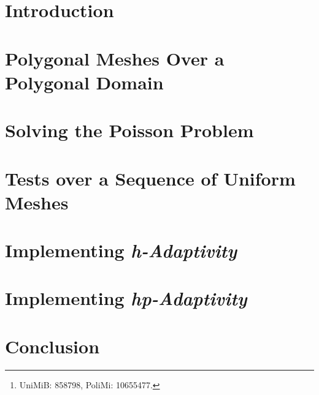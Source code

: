 \documentclass[12pt, twoside]{article}
\title{\reporttitle}
\author{Andrea Di Antonio\footnote{UniMiB: 858798, PoliMi: 10655477.} \\ Supervised by Professors Paola F. Antonietti and Marco Verani}
\date{Exam session of September 10th, 2024 \\ Academic Year 2023-24}
\begin{document}
	\maketitle
	\thispagestyle{fancy}

	\begin{abstract}
		\begin{center}
			This report details the implementation of the \textit{hp-adaptive} discontinuous Galërkin method, as part of the course \textit{Advanced Programming for Scientific Computing}. It covers key aspects including mesh generation, problem solving, and the integration of \textit{hp-adaptivity}. For technical details, refer to the project repository on \href{https://github.com/diantonioandrea/pacs-project}{GitHub}.
		\end{center}
	\end{abstract}

	\newpage
	\tableofcontents

	\newpage
    \section{Introduction}
	

	\newpage
    \section{Polygonal Meshes Over a Polygonal Domain}
	

	\newpage
    \section{Solving the Poisson Problem}
	

	\newpage
    \section{Tests over a Sequence of Uniform Meshes}
	

	\newpage
    \section{Implementing \textit{h-Adaptivity}}
	

	\newpage
    \section{Implementing \textit{hp-Adaptivity}}
	

	\newpage
    \section{Conclusion}
	

	\newpage
	
	
\end{document}
